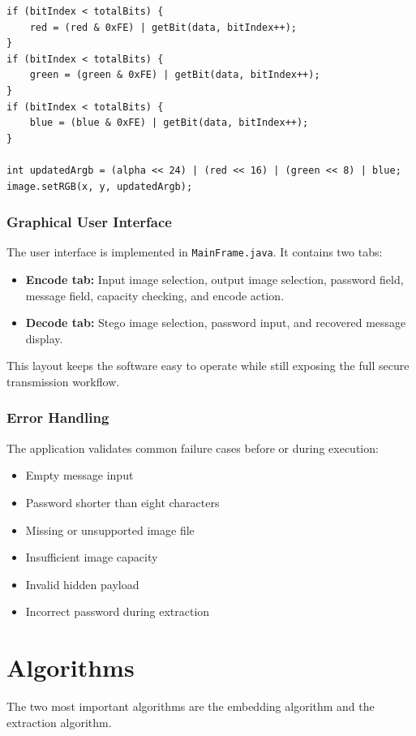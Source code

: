 \documentclass[12pt]{report}
\begin{document}
\begin{lstlisting}[caption={LSB embedding logic used in the project}]
if (bitIndex < totalBits) {
    red = (red & 0xFE) | getBit(data, bitIndex++);
}
if (bitIndex < totalBits) {
    green = (green & 0xFE) | getBit(data, bitIndex++);
}
if (bitIndex < totalBits) {
    blue = (blue & 0xFE) | getBit(data, bitIndex++);
}

int updatedArgb = (alpha << 24) | (red << 16) | (green << 8) | blue;
image.setRGB(x, y, updatedArgb);
\end{lstlisting}

\subsubsection{Graphical User Interface}
The user interface is implemented in \texttt{MainFrame.java}. It contains two tabs:
\begin{itemize}
    \item \textbf{Encode tab:} Input image selection, output image selection, password field, message field, capacity checking, and encode action.
    \item \textbf{Decode tab:} Stego image selection, password input, and recovered message display.
\end{itemize}

This layout keeps the software easy to operate while still exposing the full secure transmission workflow.

\subsubsection{Error Handling}
The application validates common failure cases before or during execution:
\begin{itemize}
    \item Empty message input
    \item Password shorter than eight characters
    \item Missing or unsupported image file
    \item Insufficient image capacity
    \item Invalid hidden payload
    \item Incorrect password during extraction
\end{itemize}

\section{Algorithms}
The two most important algorithms are the embedding algorithm and the extraction algorithm.
\end{document}
